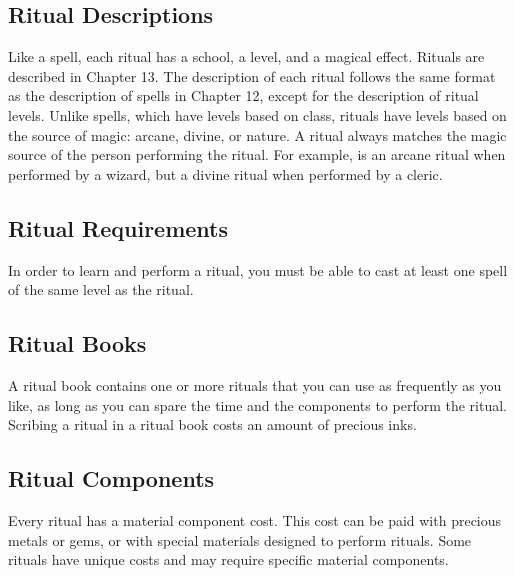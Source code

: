 \subsection{Ritual Descriptions}
\par Like a spell, each ritual has a school, a level, and a magical effect. Rituals are described in Chapter 13. The description of each ritual follows the same format as the description of spells in Chapter 12, except for the description of ritual levels. Unlike spells, which have levels based on class, rituals have levels based on the source of magic: arcane, divine, or nature. A ritual always matches the magic source of the person performing the ritual. For example,  is an arcane ritual when performed by a wizard, but a divine ritual when performed by a cleric.
\subsection{Ritual Requirements} In order to learn and perform a ritual, you must be able to cast at least one spell of the same level as the ritual.
\subsection{Ritual Books}
A ritual book contains one or more rituals that you can use as frequently as you like, as long as you can spare the time and the components to perform the ritual. Scribing a ritual in a ritual book costs an amount of precious inks.
\subsection{Ritual Components}
Every ritual has a material component cost. This cost can be paid with precious metals or gems, or with special materials designed to perform rituals. Some rituals have unique costs and may require specific material components.
